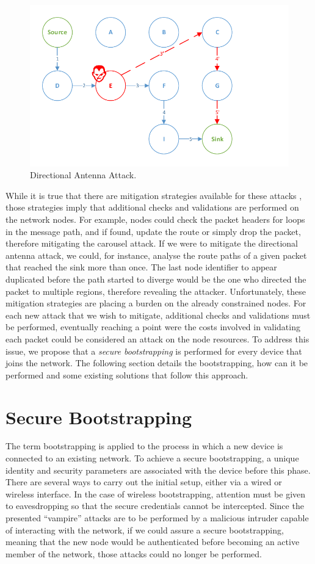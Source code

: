 \documentclass{sig-alternate-05-2015}
\begin{document}
\begin{figure}[h]
  \centering
  \includegraphics[width=0.8\linewidth]{figures/Directional_Antenna_Attack.pdf}
  \caption{Directional Antenna Attack.}
  \label{fig:directional_antenna_attack}
\end{figure}

While it is true that there are mitigation strategies available for these attacks \cite{Vasserman2013}, those strategies imply that additional checks and validations are performed on the network nodes.
For example, nodes could check the packet headers for loops in the message path, and if found, update the route or simply drop the packet, therefore mitigating the carousel attack. 
If we were to mitigate the directional antenna attack, we could, for instance, analyse the route paths of a given packet that reached the sink more than once. 
The last node identifier to appear duplicated before the path started to diverge would be the one who directed the packet to multiple regions, therefore revealing the attacker. 
Unfortunately, these mitigation strategies are placing a burden on the already constrained nodes. 
For each new attack that we wish to mitigate, additional checks and validations must be performed, eventually reaching a point were the costs involved in validating each packet could be considered an attack on the node resources. 
To address this issue, we propose that a \emph{secure bootstrapping} is performed for every device that joins the network. 
The following section details the bootstrapping, how can it be performed and some existing solutions that follow this approach.

\section{Secure Bootstrapping}
\label{sec:secure_bootstrapping}
The term bootstrapping is applied to the process in which a new device is connected to an existing network. 
To achieve a secure bootstrapping, a unique identity and security parameters are associated with the device before this phase. 
There are several ways to carry out the initial setup, either via a wired or wireless interface. 
In the case of wireless bootstrapping, attention must be given to eavesdropping so that the secure credentials cannot be intercepted.
Since the presented ``vampire'' attacks are to be performed by a malicious intruder capable of interacting with the network, if we could assure a secure bootstrapping, meaning that the new node would be authenticated before becoming an active member of the network, those attacks could no longer be performed.
\end{document}
